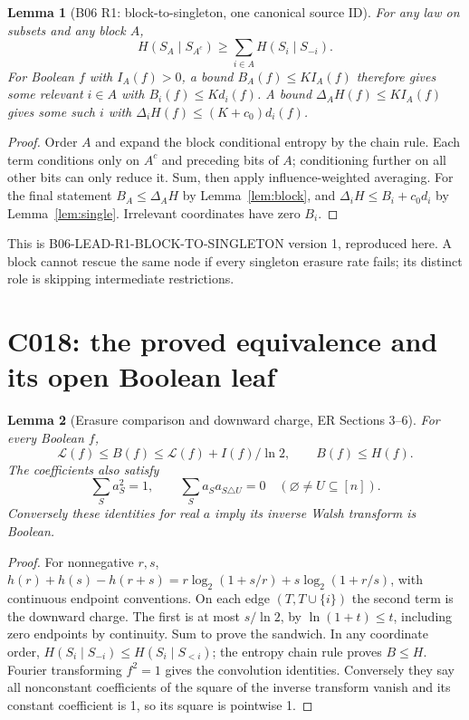 \documentclass[11pt]{article}
\newtheorem{lemma}{Lemma}
\begin{document}
\begin{lemma}[B06 R1: block-to-singleton, one canonical source ID]
\label{lem:r1}
For any law on subsets and any block $A$,
\[
H(S_A\mid S_{A^c})\ge\sum_{i\in A}H(S_i\mid S_{-i}).
\]
For Boolean $f$ with $I_A(f)>0$, a bound $B_A(f)\le KI_A(f)$
therefore gives some relevant $i\in A$ with $B_i(f)\le Kd_i(f)$.
A bound $\Delta_AH(f)\le KI_A(f)$ gives some such $i$ with
$\Delta_iH(f)\le(K+c_0)d_i(f)$.
\end{lemma}
\begin{proof}
Order $A$ and expand the block conditional entropy by the chain
rule. Each term conditions only on $A^c$ and preceding bits of
$A$; conditioning further on all other bits can only reduce it.
Sum, then apply influence-weighted averaging. For the final
statement $B_A\le\Delta_AH$ by Lemma~\ref{lem:block}, and
$\Delta_iH\le B_i+c_0d_i$ by Lemma~\ref{lem:single}.
Irrelevant coordinates have zero $B_i$.
\end{proof}
This is B06-LEAD-R1-BLOCK-TO-SINGLETON version 1, reproduced here.
A block cannot rescue the same node if every singleton erasure
rate fails; its distinct role is skipping intermediate restrictions.

\section{C018: the proved equivalence and its open Boolean leaf}
\begin{lemma}[Erasure comparison and downward charge, ER Sections 3--6]
\label{lem:downward}
For every Boolean $f$,
\[
\mathcal L(f)\le B(f)\le\mathcal L(f)+I(f)/\ln2,\qquad B(f)\le H(f).
\]
The coefficients also satisfy
\[
\sum_Sa_S^2=1,\qquad \sum_Sa_Sa_{S\triangle U}=0
\quad(\varnothing\ne U\subseteq[n]).
\]
Conversely these identities for real $a$ imply its inverse Walsh
transform is Boolean.
\end{lemma}
\begin{proof}
For nonnegative $r,s$,
$h(r)+h(s)-h(r+s)=r\log_2(1+s/r)+s\log_2(1+r/s)$,
with continuous endpoint conventions. On each edge $(T,T\cup\{i\})$
the second term is the downward charge. The first is at most
$s/\ln2$, by $\ln(1+t)\le t$, including zero endpoints by continuity.
Sum to prove the sandwich. In any coordinate order,
$H(S_i\mid S_{-i})\le H(S_i\mid S_{<i})$; the entropy chain
rule proves $B\le H$. Fourier transforming $f^2=1$ gives the
convolution identities. Conversely they say all nonconstant
coefficients of the square of the inverse transform vanish and its
constant coefficient is 1, so its square is pointwise 1.
\end{proof}
\end{document}
